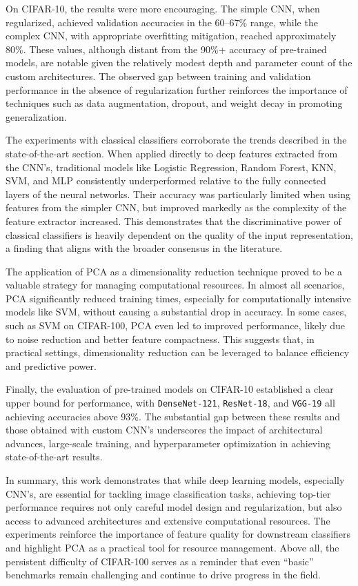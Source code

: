 \documentclass[journal,article,submit,pdftex,moreauthors]{Definitions/mdpi}
\begin{document}
On CIFAR-10, the results were more encouraging. The simple CNN, when regularized, achieved validation accuracies in the 60–67\% range, while the complex CNN, with appropriate overfitting mitigation, reached approximately 80\%. These values, although distant from the 90\%+ accuracy of pre-trained models, are notable given the relatively modest depth and parameter count of the custom architectures. The observed gap between training and validation performance in the absence of regularization further reinforces the importance of techniques such as data augmentation, dropout, and weight decay in promoting generalization.

The experiments with classical classifiers corroborate the trends described in the state-of-the-art section. When applied directly to deep features extracted from the CNN's, traditional models like Logistic Regression, Random Forest, KNN, SVM, and MLP consistently underperformed relative to the fully connected layers of the neural networks. Their accuracy was particularly limited when using features from the simpler CNN, but improved markedly as the complexity of the feature extractor increased. This demonstrates that the discriminative power of classical classifiers is heavily dependent on the quality of the input representation, a finding that aligns with the broader consensus in the literature.

The application of PCA as a dimensionality reduction technique proved to be a valuable strategy for managing computational resources. In almost all scenarios, PCA significantly reduced training times, especially for computationally intensive models like SVM, without causing a substantial drop in accuracy. In some cases, such as SVM on CIFAR-100, PCA even led to improved performance, likely due to noise reduction and better feature compactness. This suggests that, in practical settings, dimensionality reduction can be leveraged to balance efficiency and predictive power.

Finally, the evaluation of pre-trained models on CIFAR-10 established a clear upper bound for performance, with \texttt{DenseNet-121}, \texttt{ResNet-18}, and \texttt{VGG-19} all achieving accuracies above 93\%. The substantial gap between these results and those obtained with custom CNN's underscores the impact of architectural advances, large-scale training, and hyperparameter optimization in achieving state-of-the-art results.

In summary, this work demonstrates that while deep learning models, especially CNN's, are essential for tackling image classification tasks, achieving top-tier performance requires not only careful model design and regularization, but also access to advanced architectures and extensive computational resources. The experiments reinforce the importance of feature quality for downstream classifiers and highlight PCA as a practical tool for resource management. Above all, the persistent difficulty of CIFAR-100 serves as a reminder that even “basic” benchmarks remain challenging and continue to drive progress in the field.
\end{document}
